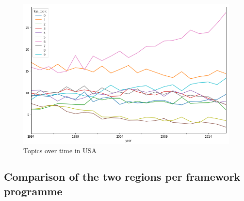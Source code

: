 \documentclass[12pt]{report}
\begin{document}
\begin{center}
\begin{figure}
\includegraphics[width=1.0\textwidth, natwidth=707,natheight=483]
{figs/topic-evolution-usa.png}
\caption{Topics over time in USA}
\end{figure}
\end{center}


\subsection{Comparison of the two regions per framework programme}
\end{document}
